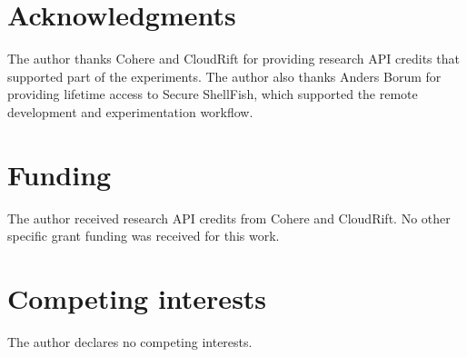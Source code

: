 \section*{Acknowledgments}
The author thanks Cohere and CloudRift for providing research API credits that supported part of the experiments. The author also thanks Anders Borum for providing lifetime access to Secure ShellFish, which supported the remote development and experimentation workflow.

\section*{Funding}
The author received research API credits from Cohere and CloudRift. No other specific grant funding was received for this work.

\section*{Competing interests}
The author declares no competing interests.

